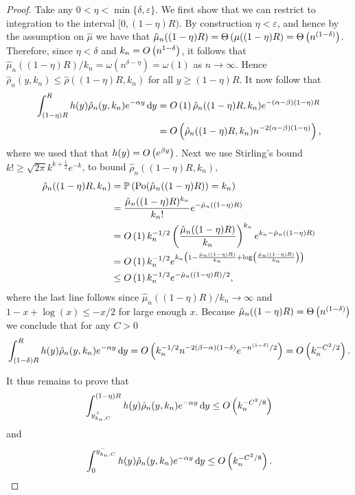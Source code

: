 \begin{appendices}
\begin{proof}
Take any $0 < \eta < \min\{\delta, \varepsilon\}$. We first show that we can restrict to integration to the interval $[0, (1-\eta)R)$. By construction $\eta < \varepsilon$, and hence by the assumption on $\hat{\mu}$ we have that $\hat{\mu}_n((1-\eta)R) = \Theta\left(\mu((1-\eta)R\right) = \Theta\left(n^{(1-\delta)}\right)$. Therefore, since $\eta<\delta$ and $k_n = O\left(n^{1-\delta}\right)$, it follows that $\hat{\mu}_n((1-\eta)R)/k_n = \omega\left(n^{\delta - \eta}\right) = \omega(1)$ as $n \to \infty$. Hence $\hat{\rho}_n(y,k_n) \le \hat{\rho}((1-\eta)R,k_n)$ for all $y \ge (1-\eta)R$. It now follow that
\begin{align*}
	\int_{(1-\eta)R}^{R} h(y) \hat{\rho}_n(y,k_n) e^{-\alpha y} \operatorname{\mathrm{d}\hspace{-2pt}} y
	&= O\left(1\right) \hat{\rho}_n((1-\eta)R,k_n) e^{-(\alpha-\beta)(1-\eta)R} \\
	&= O\left(\hat{\rho}_n((1-\eta)R,k_n) n^{-2(\alpha-\beta)(1-\eta)}\right),
\end{align*}
where we used that that $h(y) = O\left(e^{\beta y}\right)$. Next we use Stirling's bound $k! \ge \sqrt{2\pi} k^{k+\frac{1}{2}} e^{-k}$, to bound $\hat{\rho}_n((1-\eta)R,k_n)$,
\begin{align*}
	\hat{\rho}_n((1-\eta)R,k_n) &= \mathbb{P}\left({\mathrm{Po}}(\hat{\mu}_n((1-\eta)R)) = k_n\right) \\
	&= \frac{\hat{\mu}_n((1-\eta)R)^{k_n}}{k_n!} e^{-\hat{\mu}_n((1-\eta)R)}\\
	&= O\left(1\right) k_n^{-1/2} \left(\frac{\hat{\mu}_n((1-\eta)R)}{k_n}\right)^{k_n} e^{k_n - \hat{\mu}_n((1-\eta)R)}\\
	&= O\left(1\right) k_n^{-1/2} e^{k_n\left(1 - \frac{\hat{\mu}_n((1-\eta)R)}{k_n}+ \log\left(\frac{\hat{\mu}_n((1-\eta)R)}{k_n}\right)\right)}\\
	&\le O\left(1\right) k_n^{-1/2} e^{-\hat{\mu}_n((1-\eta)R)/2},
\end{align*}
where the last line follows since $\hat{\mu}_n((1-\eta)R)/k_n \to \infty$ and $1 - x + \log(x) \le -x/2$ for large enough $x$. Because $\hat{\mu}_n((1-\eta)R) = \Theta\left(n^{(1-\delta)}\right)$ we conclude that for any $C > 0$
\[
	\int_{(1-\delta)R}^{R} h(y) \hat{\rho}_n(y,k_n) e^{-\alpha y} \operatorname{\mathrm{d}\hspace{-2pt}} y
	= O\left(k_n^{-1/2} n^{-2(\beta-\alpha)(1-\delta)} e^{-n^{(1-\delta)}/2}\right)
	= O\left(k_n^{-C^2/2}\right).
\]

It thus remains to prove that 
\[
	\int_{y_{k_n,C}^+}^{(1-\eta)R} h(y) \hat{\rho}_n(y,k_n) e^{-\alpha y} \operatorname{\mathrm{d}\hspace{-2pt}} y
	\le O\left(k_n^{-C^2/8}\right)
\]
and
\[
	\int_0^{y_{k_n,C}^-} h(y) \hat{\rho}_n(y,k_n) e^{-\alpha y} \operatorname{\mathrm{d}\hspace{-2pt}} y
	\le O\left(k_n^{-C^2/8}\right).
\]


\end{proof}
\end{appendices}
